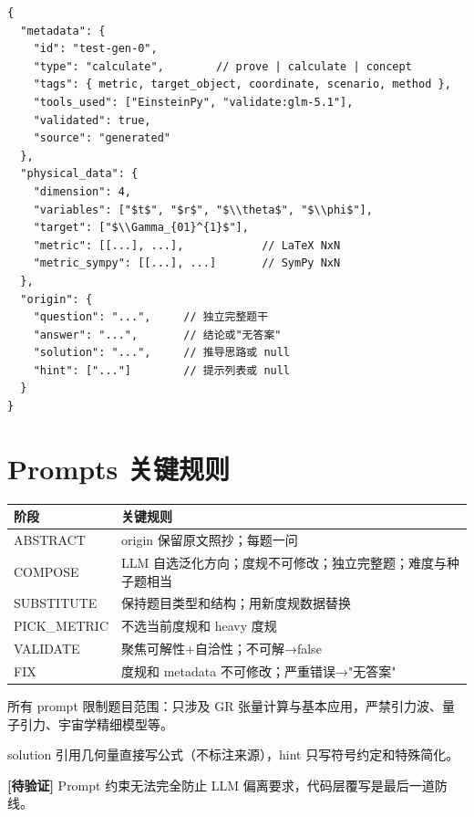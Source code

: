 \documentclass[12pt,a4paper]{article}
\newcommand{\uncertain}[1]{{\color{uncertcolor}\textbf{[待验证]}} #1}
\begin{document}
\begin{lstlisting}
{
  "metadata": {
    "id": "test-gen-0",
    "type": "calculate",        // prove | calculate | concept
    "tags": { metric, target_object, coordinate, scenario, method },
    "tools_used": ["EinsteinPy", "validate:glm-5.1"],
    "validated": true,
    "source": "generated"
  },
  "physical_data": {
    "dimension": 4,
    "variables": ["$t$", "$r$", "$\\theta$", "$\\phi$"],
    "target": ["$\\Gamma_{01}^{1}$"],
    "metric": [[...], ...],            // LaTeX NxN
    "metric_sympy": [[...], ...]       // SymPy NxN
  },
  "origin": {
    "question": "...",     // 独立完整题干
    "answer": "...",       // 结论或"无答案"
    "solution": "...",     // 推导思路或 null
    "hint": ["..."]        // 提示列表或 null
  }
}
\end{lstlisting}

\section{Prompts 关键规则}

\begin{center}
\begin{tabular}{lp{8cm}}
\toprule
阶段 & 关键规则 \\
\midrule
ABSTRACT & origin 保留原文照抄；每题一问 \\
COMPOSE & LLM 自选泛化方向；度规不可修改；独立完整题；难度与种子题相当 \\
SUBSTITUTE & 保持题目类型和结构；用新度规数据替换 \\
PICK\_METRIC & 不选当前度规和 heavy 度规 \\
VALIDATE & 聚焦可解性+自洽性；不可解→false \\
FIX & 度规和 metadata 不可修改；严重错误→"无答案" \\
\bottomrule
\end{tabular}
\end{center}

所有 prompt 限制题目范围：只涉及 GR 张量计算与基本应用，严禁引力波、量子引力、宇宙学精细模型等。

solution 引用几何量直接写公式（不标注来源），hint 只写符号约定和特殊简化。

\uncertain{Prompt 约束无法完全防止 LLM 偏离要求，代码层覆写是最后一道防线。}
\end{document}
